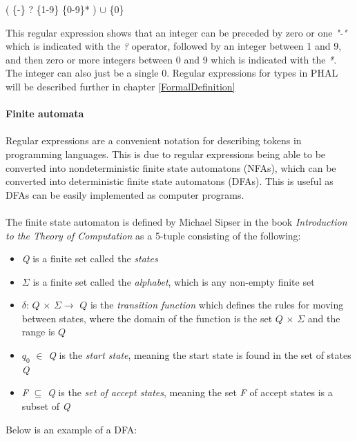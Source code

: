 \begin{center}
    ( \{-\} ? \{1-9\} \{0-9\}* ) $\cup$ \{0\}
\end{center}
This regular expression shows that an integer can be preceded by zero or one \textit{"-"} which is indicated with the \textit{?} operator, followed by an integer between 1 and 9, and then zero or more integers between 0 and 9 which is indicated with the \textit{*}. The integer can also just be a single 0. Regular expressions for types in PHAL will be described further in chapter \ref{FormalDefinition}
\\\\
\textbf{Finite automata}\
\\\\
Regular expressions are a convenient notation for describing tokens in programming languages. This is due to regular expressions being able to be converted into nondeterministic finite state automatons (NFAs), which can be converted into deterministic finite state automatons (DFAs). This is useful as DFAs can be easily implemented as computer programs. 
\\\\
The finite state automaton is defined by Michael Sipser in the book \textit{Introduction to the Theory of Computation} as a 5-tuple consisting of the following:
\begin{itemize}
    \item \textit{Q} is a finite set called the \textit{states}
    \item $\Sigma$ is a finite set called the \textit{alphabet}, which is any non-empty finite set 
    \item $\delta$: $Q$ $\times$ $\Sigma \xrightarrow{}$ $Q$ is the \textit{transition function} which defines the rules for moving between states, where the domain of the function is the set $Q$ $\times$ $\Sigma$ and the range is $Q$
    \item $q_{0}$ $\in$ \textit{Q} is the \textit{start state}, meaning the start state is found in the set of states \textit{Q}
    \item \textit{F} $\subseteq$ \textit{Q} is the \textit{set of accept states}, meaning the set \textit{F} of accept states is a subset of \textit{Q} \cite{sipser}
\end{itemize}
Below is an example of a DFA:
